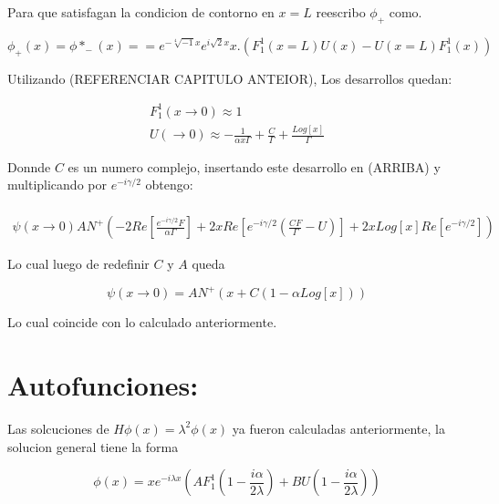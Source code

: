 Para que satisfagan la condicion de contorno en $ x=L $ reescribo $ \phi _{+}$ como.

\begin{equation}
\phi _{+} (x) = \phi * _{-} (x) = 
= e ^{- \sqrt[4]{-1} x } e ^{i \sqrt{2} x } x.
\left(
F _1 ^1 (x=L) U(x) - U(x=L) F _1 ^1 (x)
\right)
\end{equation}


Utilizando (REFERENCIAR CAPITULO ANTEIOR), Los desarrollos quedan:

\begin{equation}
\begin{array}{c}
F _1 ^1 (x \rightarrow 0 ) \approx 1 \\
U( \rightarrow 0  ) \approx - \frac{1}{\alpha x \Gamma} + \frac{C}{\Gamma} + \frac{Log[x]}{\Gamma}
\end{array}
\end{equation}


Donnde $C$ es un numero complejo, insertando este desarrollo en (ARRIBA) y multiplicando por $ e ^{- i \gamma /2}$ obtengo:

\begin{equation}
\begin{array}{c} \\
\psi (x \rightarrow 0 )
A N ^{+}
\left(
-2 Re[ \frac{e ^{-i \gamma /2} F}{\alpha \Gamma} ] + 
2 x Re [ e ^{-i \gamma /2} (\frac{C F}{\Gamma} - U ) ] + 
2 x Log[x] Re [ e ^{- i \gamma /2 }]
\right)
\end{array}
\end{equation}

Lo cual luego de redefinir $C$ y $A$ queda 

\begin{equation}
\psi (x \rightarrow 0 ) = A N ^{+} 
\left(
x + C (1- \alpha Log[x] )
\right)
\end{equation}

Lo cual coincide con lo calculado anteriormente.

\section{Autofunciones:}

Las solcuciones de $H \phi (x) = \lambda ^2 \phi (x)$ ya fueron calculadas anteriormente, la solucion general tiene la forma

\begin{equation}
\phi (x) = 
x e ^{-i \lambda x}
\left(
A  F _1 ^1 \left( 1 - \frac{i \alpha}{2\lambda}  \right) + 
B  U \left( 1 - \frac{i \alpha}{2\lambda}  \right)
\right)
\end{equation}

